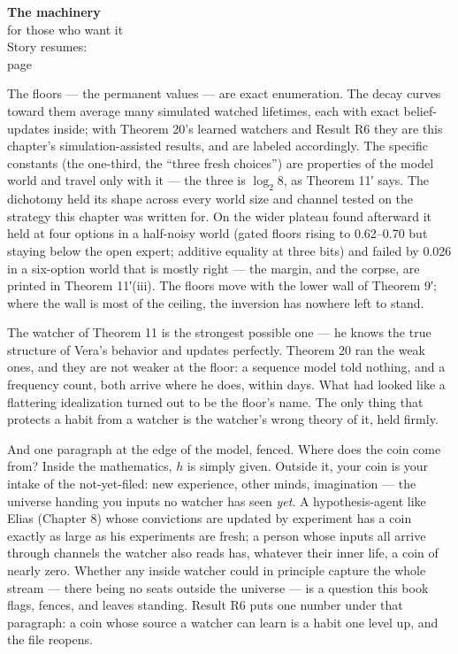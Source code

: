 \begin{machinery}{\textbf{The machinery}\\for those who want it\\[3pt]{\color{muted}Story resumes:\\page~\pageref{partIV}}}


The floors --- the permanent values --- are exact enumeration. The decay
curves toward them average many simulated watched lifetimes, each with
exact belief-updates inside; with Theorem 20's learned watchers and
Result R6 they are this chapter's simulation-assisted results, and are
labeled accordingly. The specific
constants (the one-third, the ``three fresh choices'') are properties of
the model world and travel only with it --- the three is \(\log_2 8\), as
Theorem 11′ says. The dichotomy held its shape across every world size
and channel tested on the strategy this chapter was written for. On
the wider plateau found afterward it held at four options in a
half-noisy world (gated floors rising to 0.62--0.70 but staying below
the open expert; additive equality at three bits) and failed by 0.026
in a six-option world that is mostly right --- the margin, and the
corpse, are printed in Theorem 11′(iii). The floors move with the
lower wall of Theorem 9′; where the wall is most of the ceiling, the
inversion has nowhere left to stand.

The watcher of
Theorem 11 is the strongest possible one --- he knows the true structure
of Vera's behavior and updates perfectly. Theorem 20 ran the weak ones,
and they are not weaker at the floor: a sequence model told nothing,
and a frequency count, both arrive where he does, within days. What
had looked like a flattering idealization turned out to be the floor's
name. The only thing that protects a habit from a watcher is the
watcher's wrong theory of it, held firmly.

And one paragraph at the edge of the model, fenced. Where does the
coin come from? Inside the mathematics, \(h\) is simply given. Outside it,
your coin is your intake of the not-yet-filed: new experience, other
minds, imagination --- the universe handing you inputs no watcher has
seen \emph{yet}. A hypothesis-agent like Elias (Chapter 8) whose convictions
are updated by experiment has a coin exactly as large as his
experiments are fresh; a person whose inputs all arrive through
channels the watcher also reads has, whatever their inner life, a coin
of nearly zero. Whether any inside watcher could in principle capture
the whole stream --- there being no seats outside the universe --- is a
question this book flags, fences, and leaves standing. 
Result R6 puts one number under that paragraph: a coin whose source a
watcher can learn is a habit one level up, and the file reopens.

\end{machinery}

